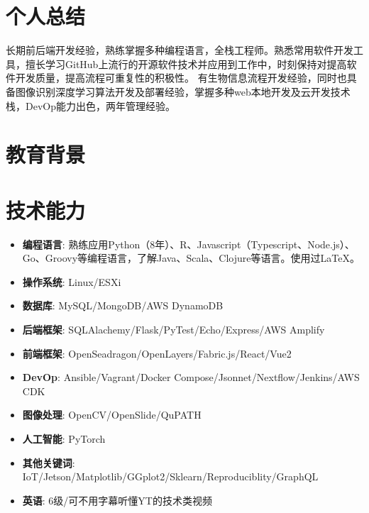 \documentclass{resume}
\begin{document}


 
\section{个人总结}
长期前后端开发经验，熟练掌握多种编程语言，全栈工程师。熟悉常用软件开发工具，擅长学习GitHub上流行的开源软件技术并应用到工作中，时刻保持对提高软件开发质量，提高流程可重复性的积极性。
有生物信息流程开发经验，同时也具备图像识别深度学习算法开发及部署经验，掌握多种web本地开发及云开发技术栈，DevOp能力出色，两年管理经验。

\section{教育背景}

\section{技术能力}
\begin{itemize}[parsep=0.2ex]
  \item \textbf{编程语言}: 熟练应用Python（8年）、R、Javascript（Typescript、Node.js）、Go、Groovy等编程语言，了解Java、Scala、Clojure等语言。使用过\LaTeX{}。
  \item \textbf{操作系统}: Linux/ESXi
  \item \textbf{数据库}: MySQL/MongoDB/AWS DynamoDB
  \item \textbf{后端框架}: SQLAlachemy/Flask/PyTest/Echo/Express/AWS Amplify
  \item \textbf{前端框架}: OpenSeadragon/OpenLayers/Fabric.js/React/Vue2
  \item \textbf{DevOp}: Ansible/Vagrant/Docker Compose/Jsonnet/Nextflow/Jenkins/AWS CDK
  \item \textbf{图像处理}: OpenCV/OpenSlide/QuPATH
  \item \textbf{人工智能}: PyTorch
  \item \textbf{其他关键词}: IoT/Jetson/Matplotlib/GGplot2/Sklearn/Reproduciblity/GraphQL
  \item \textbf{英语}: 6级/可不用字幕听懂YT的技术类视频
\end{itemize}
\end{document}

